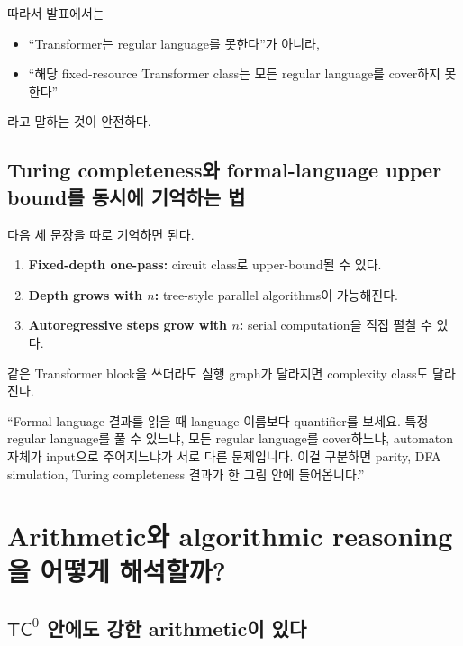 \documentclass[11pt,a4paper,oneside,openany]{memoir}
\theoremstyle{definition}
\newcommand{\TC}{\mathsf{TC}}
\begin{document}
따라서 발표에서는
\begin{itemize}
  \item ``Transformer는 regular language를 못한다''가 아니라,
  \item ``해당 fixed-resource Transformer class는 모든 regular language를 cover하지 못한다''
\end{itemize}
라고 말하는 것이 안전하다.

\section{Turing completeness와 formal-language upper bound를 동시에 기억하는 법}

다음 세 문장을 따로 기억하면 된다.

\begin{enumerate}
  \item \textbf{Fixed-depth one-pass:} circuit class로 upper-bound될 수 있다.
  \item \textbf{Depth grows with $n$:} tree-style parallel algorithms이 가능해진다.
  \item \textbf{Autoregressive steps grow with $n$:} serial computation을 직접 펼칠 수 있다.
\end{enumerate}

같은 Transformer block을 쓰더라도 실행 graph가 달라지면 complexity class도 달라진다.

\begin{presentbox}
``Formal-language 결과를 읽을 때 language 이름보다 quantifier를 보세요. 특정 regular language를 풀 수 있느냐, 모든 regular language를 cover하느냐, automaton 자체가 input으로 주어지느냐가 서로 다른 문제입니다. 이걸 구분하면 parity, DFA simulation, Turing completeness 결과가 한 그림 안에 들어옵니다.''
\end{presentbox}

\chapter{Arithmetic와 algorithmic reasoning을 어떻게 해석할까?}

\section{\texorpdfstring{$\TC^0$ 안에도 강한 arithmetic이 있다}{TC0 안에도 강한 arithmetic이 있다}}
\end{document}
